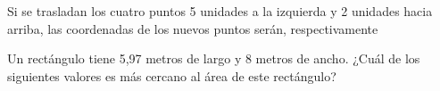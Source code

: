\documentclass[letterpaper,10pt]{examdesign}
\begin{document}
\begin{multiplechoice}[rearrange=yes,keycolumns=4,examcolumns=2]
\begin{block}
\begin{question}
Si se trasladan los cuatro puntos 5 unidades a la izquierda y 2 unidades hacia arriba, las coordenadas de los nuevos puntos serán, respectivamente
\end{question}
\end{block}
\begin{question}
Un rectángulo tiene 5,97 metros de largo y 8 metros de ancho. ¿Cuál de los siguientes valores es más cercano al área de este rectángulo?
\end{question}
\end{multiplechoice}
\end{document}
